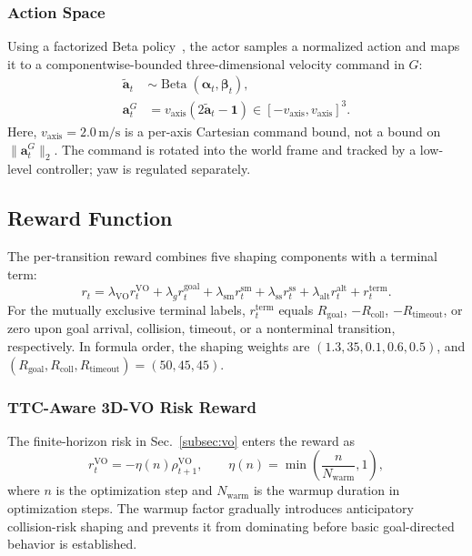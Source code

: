 \documentclass[letterpaper, 10 pt, conference]{ieeeconf}
\begin{document}
\subsubsection{Action Space}
Using a factorized Beta policy~\cite{navrl}, the actor samples a normalized action and maps it to a componentwise-bounded three-dimensional velocity command in \(G\):
\begin{equation}
	\begin{aligned}
	\tilde{\mathbf{a}}_t&\sim
	\operatorname{Beta}(\boldsymbol{\alpha}_t,\boldsymbol{\beta}_t),\\[-1mm]
		\mathbf{a}_t^{G}&=v_{\mathrm{axis}}(2\tilde{\mathbf{a}}_t-\mathbf{1})
		\in[-v_{\mathrm{axis}},v_{\mathrm{axis}}]^3.
	\end{aligned}
	\label{eq:beta_action}
\end{equation}
Here, \(v_{\mathrm{axis}}=2.0\,\mathrm{m/s}\) is a per-axis Cartesian command bound, not a bound on \(\lVert\mathbf{a}_t^G\rVert_2\). The command is rotated into the world frame and tracked by a low-level controller; yaw is regulated separately.

\subsection{Reward Function}\label{subsec:reward}
The per-transition reward combines five shaping components with a terminal term:
\begin{equation}
	r_t
	=\lambda_{\mathrm{VO}}r_t^{\mathrm{VO}}
	+\lambda_g r_t^{\mathrm{goal}}
	+\lambda_{\mathrm{sm}}r_t^{\mathrm{sm}}
	+\lambda_{\mathrm{ss}}r_t^{\mathrm{ss}}
	+\lambda_{\mathrm{alt}} r_t^{\mathrm{alt}}
	+r_t^{\mathrm{term}}.
	\label{eq:reward_total}
\end{equation}
For the mutually exclusive terminal labels, \(r_t^{\mathrm{term}}\) equals \(R_{\mathrm{goal}}\), \(-R_{\mathrm{coll}}\), \(-R_{\mathrm{timeout}}\), or zero upon goal arrival, collision, timeout, or a nonterminal transition, respectively. In formula order, the shaping weights are \((1.3,35,0.1,0.6,0.5)\), and \((R_{\mathrm{goal}},R_{\mathrm{coll}},R_{\mathrm{timeout}})=(50,45,45)\).

\subsubsection{TTC-Aware 3D-VO Risk Reward}
The finite-horizon risk in Sec.~\ref{subsec:vo} enters the reward as
\begin{equation}
	r_t^{\mathrm{VO}}
	=-\eta(n)\rho_{t+1}^{\mathrm{VO}},
	\qquad
	\eta(n)=\min\!\left(\frac{n}{N_{\mathrm{warm}}},1\right),
	\label{eq:vo_reward}
\end{equation}
where \(n\) is the optimization step and \(N_{\mathrm{warm}}\) is the warmup duration in optimization steps. The warmup factor gradually introduces anticipatory collision-risk shaping and prevents it from dominating before basic goal-directed behavior is established.
\end{document}
